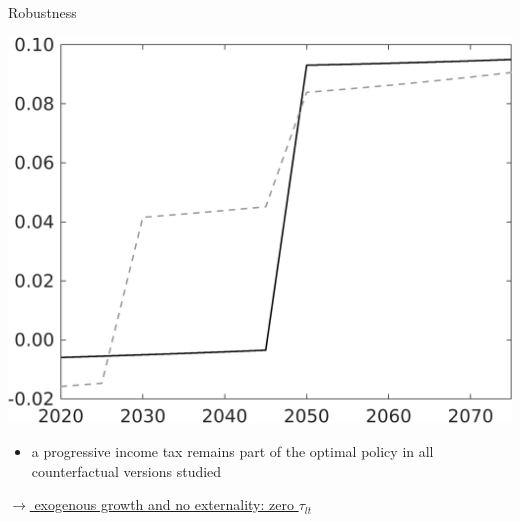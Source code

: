 \documentclass[11pt,aspectratio=169]{beamer}
\begin{document}
\begin{frame}{Robustness}
\begin{minipage}[]{0.3\textwidth}
\end{minipage}
\begin{minipage}[]{0.3\textwidth}
	\includegraphics[width=1\textwidth]{../codding_model/own_basedOnFried/optimalPol_elastS_DisuSci/figures/all_1705/SingleROB_countec_OPT_T_NoTaus_taul_spillover0_noskill0_sep1_BN0_ineq0_red0_etaa0.79_lgd0.png}
\end{minipage}

\vspace{6mm}
\begin{itemize}
\item a progressive income tax remains part of the optimal policy in all counterfactual versions studied	
\end{itemize}
	\vspace{4mm}
\hfill
\hyperlink{zerotaul}{\tiny{$\rightarrow$ exogenous growth and no externality: zero $\tau_{lt}$}}
\hypertarget{backrob}{} 
\end{frame}


\hypertarget{conc}{}
\end{document}

